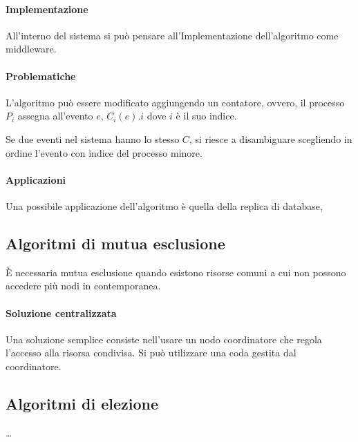 \paragraph{Implementazione}
All'interno del sistema si può pensare all'Implementazione
dell'algoritmo come middleware.

\paragraph{Problematiche}
L'algoritmo può essere modificato aggiungendo un contatore, 
ovvero, il processo $P_i$ assegna all'evento 
$e$, $C_i(e).i$ dove $i$ è il suo indice.

Se due eventi nel sistema hanno lo stesso $C$, si riesce 
a disambiguare scegliendo in ordine l'evento con indice 
del processo minore.

\paragraph{Applicazioni}
Una possibile applicazione dell'algoritmo è quella 
della replica di database, 

\subsection{Algoritmi di mutua esclusione}
È necessaria mutua esclusione quando esistono risorse 
comuni a cui non possono accedere più nodi in contemporanea.

\paragraph{Soluzione centralizzata}
Una soluzione semplice consiste nell'usare un nodo 
coordinatore che regola l'accesso alla risorsa 
condivisa. Si può utilizzare una coda gestita dal coordinatore.


\subsection{Algoritmi di elezione}
\dots